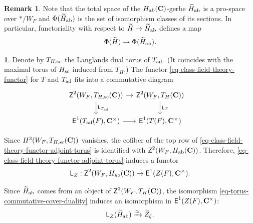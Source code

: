 \documentclass[10pt,english,reqno]{amsart}
\newcommand{\complexes}{\mathbf C}
\newcommand{\cycle}{\textnormal{\textsf{Z}}}
\newcommand{\extension}{\textnormal{\textsf{E}}}
\newcommand{\sconn}{\textnormal{sc}}
\newcommand{\adjoint}{\textnormal{ad}}
\newcommand{\abelian}{\textnormal{ab}}
\newcommand{\Langlands}{\textnormal{\textsf{L}}}
\theoremstyle{definition}
\newtheorem{rem}[subsubsection]{Remark}
\numberwithin{equation}{section}
\newtheorem{untitledsubsubsection}[subsubsection]{}
\newenvironment{void}
{\begin{untitledsubsubsection}}
{\end{untitledsubsubsection}}
\begin{document}

\begin{rem}
Note that the total space of the $H_{\abelian}(\complexes)$-gerbe $\widetilde H_{\abelian}$ is a pro-space over $*/W_F$ and $\Phi(\widetilde H_{\abelian})$ is the set of isomorphism classes of its sections. In particular, functoriality with respect to $\widetilde H \rightarrow \widetilde H_{\abelian}$ defines a map
\begin{equation}
\label{eq-langlands-parameter-functoriality-cocenter}
\Phi(\widetilde H) \rightarrow \Phi(\widetilde H_{\abelian}).
\end{equation}
\end{rem}


\begin{void}
Denote by $T_{H, \sconn}$ the Langlands dual torus of $T_{\adjoint}$. (It coincides with the maximal torus of $H_{\sconn}$ induced from $T_H$.) The functor \eqref{eq-class-field-theory-functor} for $T$ and $T_{\adjoint}$ fits into a commutative diagram
\begin{equation}
\label{eq-class-field-theory-functor-adjoint-torus}
\begin{tikzcd}[column sep = 1em]
	\cycle^2(W_F, T_{H, \sconn}(\complexes)) \ar[r]\ar[d, "\Langlands_{T_{\adjoint}}"] & \cycle^2(W_F, T_H(\complexes)) \ar[d, "\Langlands_T"] & \\
	\extension^1(T_{\adjoint}(F), \complexes^{\times}) \ar[r] & \extension^1(T(F), \complexes^{\times})
\end{tikzcd}
\end{equation}

Since $H^3(W_F, T_{H, \sconn}(\complexes))$ vanishes, the cofiber of the top row of \eqref{eq-class-field-theory-functor-adjoint-torus} is identified with $\cycle^2(W_F, H_{\abelian}(\complexes))$. Therefore, \eqref{eq-class-field-theory-functor-adjoint-torus} induces a functor
\begin{equation}
\label{eq-class-field-theory-functor-center}
	\Langlands_Z : \cycle^2(W_F, H_{\abelian}(\complexes)) \rightarrow \extension^1(Z(F), \complexes^{\times}).
\end{equation}

Since $\widetilde H_{\abelian}$ comes from an object of $\cycle^2(W_F, T_H(\complexes))$, the isomorphism \eqref{eq-torus-commutative-cover-duality} induces an isomorphism in $\extension^1(Z(F), \complexes^{\times})$:
\begin{equation}
\label{eq-center-commutative-cover-duality}
\Langlands_Z(\widetilde H_{\abelian}) \xrightarrow{\simeq} \widetilde Z_{\zeta}.
\end{equation}
\end{void}
\end{document}
